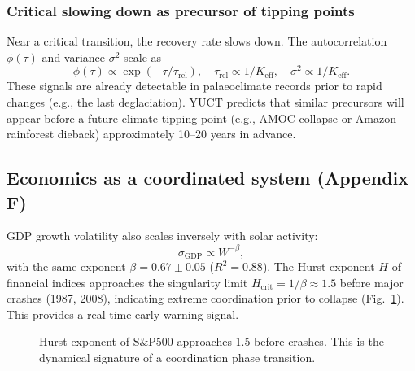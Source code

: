 \documentclass[12pt,a4paper]{article}
\newcommand{\Keff}{K_{\mathrm{eff}}}
\begin{document}
	\subsubsection{Critical slowing down as precursor of tipping points}
	
	Near a critical transition, the recovery rate slows down. The autocorrelation
	$\phi(\tau)$ and variance $\sigma^2$ scale as
	\[
	\phi(\tau) \propto \exp(-\tau/\tau_{\text{rel}}),\quad
	\tau_{\text{rel}} \propto 1/\Keff,\quad
	\sigma^2 \propto 1/\Keff.
	\]
	These signals are already detectable in palaeoclimate records prior to rapid changes
	(e.g., the last deglaciation). YUCT predicts that similar precursors will appear
	before a future climate tipping point (e.g., AMOC collapse or Amazon rainforest
	dieback) approximately 10–20 years in advance.
	
	\subsection{Economics as a coordinated system (Appendix F)}
	
	GDP growth volatility also scales inversely with solar activity:
	\[
	\sigma_{\text{GDP}} \propto W^{-\beta},
	\]
	with the same exponent $\beta = 0.67 \pm 0.05$ ($R^2 = 0.88$). The Hurst exponent
	$H$ of financial indices approaches the singularity limit $H_{\text{crit}} = 1/\beta
	\approx 1.5$ before major crashes (1987, 2008), indicating extreme coordination
	prior to collapse (Fig.~\ref{fig:hurst}). This provides a real‑time early warning
	signal.
	
	\begin{figure}[H]
		\centering
		\caption{Hurst exponent of S\&P500 approaches 1.5 before crashes.
			This is the dynamical signature of a coordination phase transition.}
		\label{fig:hurst}
	\end{figure}
	
\end{document}
